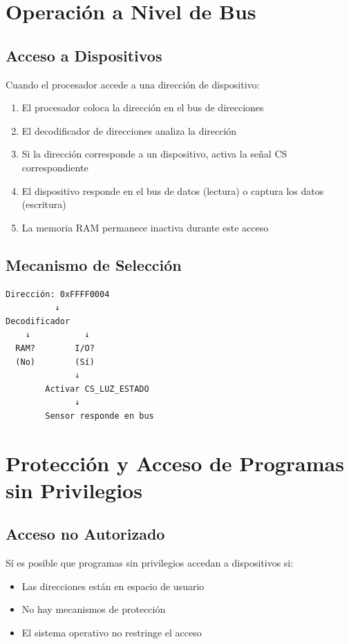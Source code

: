 \documentclass[12pt,a4paper]{article}
\begin{document}
\section{Operación a Nivel de Bus}

\subsection{Acceso a Dispositivos}
Cuando el procesador accede a una dirección de dispositivo:

\begin{enumerate}
    \item El procesador coloca la dirección en el bus de direcciones
    \item El decodificador de direcciones analiza la dirección
    \item Si la dirección corresponde a un dispositivo, activa la señal CS correspondiente
    \item El dispositivo responde en el bus de datos (lectura) o captura los datos (escritura)
    \item La memoria RAM permanece inactiva durante este acceso
\end{enumerate}

\subsection{Mecanismo de Selección}
\begin{verbatim}
Dirección: 0xFFFF0004
          ↓
Decodificador
    ↓           ↓
  RAM?        I/O?
  (No)        (Sí)
              ↓
        Activar CS_LUZ_ESTADO
              ↓
        Sensor responde en bus
\end{verbatim}

\section{Protección y Acceso de Programas sin Privilegios}

\subsection{Acceso no Autorizado}
Sí es posible que programas sin privilegios accedan a dispositivos si:
\begin{itemize}
    \item Las direcciones están en espacio de usuario
    \item No hay mecanismos de protección
    \item El sistema operativo no restringe el acceso
\end{itemize}
\end{document}
